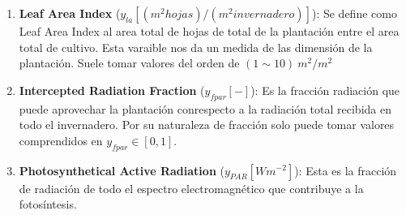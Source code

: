     \begin{enumerate}
        \item \textbf{Leaf Area Index} ($y_{la}[(m^2 hojas)/(m^{2} invernadero )]$): Se define como Leaf Area Index al area total de hojas de total de la plantación entre el area total de cultivo. Esta varaible  nos da un medida de las dimensión de la plantación. Suele tomar valores del orden de $(1 \sim 10) \ m^2/m^2$  
    
        \item \textbf{Intercepted Radiation Fraction} ($y_{fpar}[-]$): Es la fracción radiación que puede aprovechar la plantación conrespecto a la radiación total recibida en todo el invernadero. Por su naturaleza de fracción solo puede tomar valores comprendidos en $y_{fpar} \in [0,1]$.
        \item \textbf{Photosynthetical Active Radiation} ($y_{PAR}[Wm^{-2}]$): Esta es la fracción de radiación de todo el espectro electromagnético que contribuye a la fotosíntesis. 

    
    \end{enumerate} 